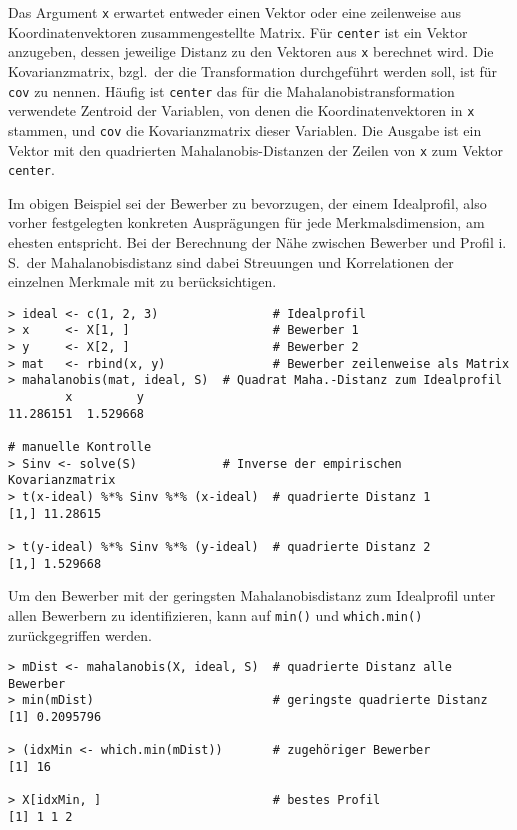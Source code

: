 Das Argument \lstinline!x! erwartet entweder einen Vektor oder eine zeilenweise aus Koordinatenvektoren zusammengestellte Matrix. Für \lstinline!center! ist ein Vektor anzugeben, dessen jeweilige Distanz zu den Vektoren aus \lstinline!x! berechnet wird. Die Kovarianzmatrix, bzgl.\ der die Transformation durchgeführt werden soll, ist für \lstinline!cov! zu nennen. Häufig ist \lstinline!center! das für die Mahalanobistransformation verwendete Zentroid der Variablen, von denen die Koordinatenvektoren in \lstinline!x! stammen, und \lstinline!cov! die Kovarianzmatrix dieser Variablen. Die Ausgabe ist ein Vektor mit den quadrierten Mahalanobis-Distanzen der Zeilen von \lstinline!x! zum Vektor \lstinline!center!.

Im obigen Beispiel sei der Bewerber zu bevorzugen, der einem Idealprofil, also vorher festgelegten konkreten Ausprägungen für jede Merkmalsdimension, am ehesten entspricht. Bei der Berechnung der Nähe zwischen Bewerber und Profil i.\,S.\ der Mahalanobisdistanz sind dabei Streuungen und Korrelationen der einzelnen Merkmale mit zu berücksichtigen.
\begin{lstlisting}
> ideal <- c(1, 2, 3)                # Idealprofil
> x     <- X[1, ]                    # Bewerber 1
> y     <- X[2, ]                    # Bewerber 2
> mat   <- rbind(x, y)               # Bewerber zeilenweise als Matrix
> mahalanobis(mat, ideal, S)  # Quadrat Maha.-Distanz zum Idealprofil
        x         y
11.286151  1.529668

# manuelle Kontrolle
> Sinv <- solve(S)            # Inverse der empirischen Kovarianzmatrix
> t(x-ideal) %*% Sinv %*% (x-ideal)  # quadrierte Distanz 1
[1,] 11.28615

> t(y-ideal) %*% Sinv %*% (y-ideal)  # quadrierte Distanz 2
[1,] 1.529668
\end{lstlisting}

Um den Bewerber mit der geringsten Mahalanobisdistanz zum Idealprofil unter allen Bewerbern zu identifizieren, kann auf \lstinline!min()! und \lstinline!which.min()! zurückgegriffen werden.
\begin{lstlisting}
> mDist <- mahalanobis(X, ideal, S)  # quadrierte Distanz alle Bewerber
> min(mDist)                         # geringste quadrierte Distanz
[1] 0.2095796

> (idxMin <- which.min(mDist))       # zugehöriger Bewerber
[1] 16

> X[idxMin, ]                        # bestes Profil
[1] 1 1 2
\end{lstlisting}

